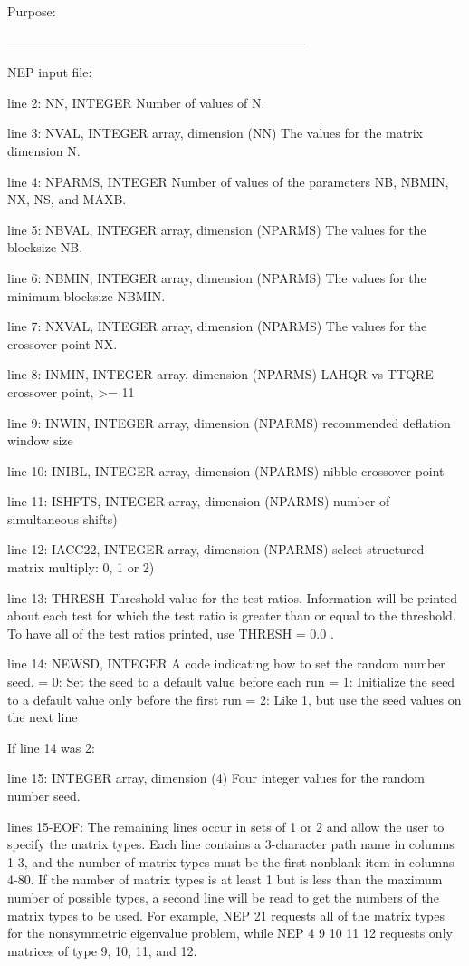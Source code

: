 \begin{DoxyParagraph}{Purpose\+: }
\begin{DoxyVerb}
-----------------------------------------------------------------------

 NEP input file:

 line 2:  NN, INTEGER
          Number of values of N.

 line 3:  NVAL, INTEGER array, dimension (NN)
          The values for the matrix dimension N.

 line 4:  NPARMS, INTEGER
          Number of values of the parameters NB, NBMIN, NX, NS, and
          MAXB.

 line 5:  NBVAL, INTEGER array, dimension (NPARMS)
          The values for the blocksize NB.

 line 6:  NBMIN, INTEGER array, dimension (NPARMS)
          The values for the minimum blocksize NBMIN.

 line 7:  NXVAL, INTEGER array, dimension (NPARMS)
          The values for the crossover point NX.

 line 8:  INMIN, INTEGER array, dimension (NPARMS)
          LAHQR vs TTQRE crossover point, >= 11

 line 9:  INWIN, INTEGER array, dimension (NPARMS)
          recommended deflation window size

 line 10: INIBL, INTEGER array, dimension (NPARMS)
          nibble crossover point

 line 11:  ISHFTS, INTEGER array, dimension (NPARMS)
          number of simultaneous shifts)

 line 12:  IACC22, INTEGER array, dimension (NPARMS)
          select structured matrix multiply: 0, 1 or 2)

 line 13: THRESH
          Threshold value for the test ratios.  Information will be
          printed about each test for which the test ratio is greater
          than or equal to the threshold.  To have all of the test
          ratios printed, use THRESH = 0.0 .

 line 14: NEWSD, INTEGER
          A code indicating how to set the random number seed.
          = 0:  Set the seed to a default value before each run
          = 1:  Initialize the seed to a default value only before the
                first run
          = 2:  Like 1, but use the seed values on the next line

 If line 14 was 2:

 line 15: INTEGER array, dimension (4)
          Four integer values for the random number seed.

 lines 15-EOF:  The remaining lines occur in sets of 1 or 2 and allow
          the user to specify the matrix types.  Each line contains
          a 3-character path name in columns 1-3, and the number
          of matrix types must be the first nonblank item in columns
          4-80.  If the number of matrix types is at least 1 but is
          less than the maximum number of possible types, a second
          line will be read to get the numbers of the matrix types to
          be used.  For example,
 NEP 21
          requests all of the matrix types for the nonsymmetric
          eigenvalue problem, while
 NEP  4
 9 10 11 12
          requests only matrices of type 9, 10, 11, and 12.


\end{DoxyVerb}
\end{DoxyParagraph}
